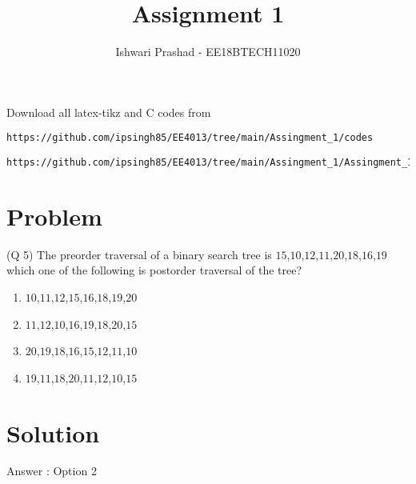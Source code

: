 \documentclass[journal,12pt,twocolumn]{IEEEtran}
\begin{document}
     \def\rightbox#1{\makebox[0in][r]{#1}}
     \def\centbox#1{\makebox[0in]{#1}}
     \def\topbox#1{\raisebox{-\baselineskip}[0in][0in]{#1}}
     \def\midbox#1{\raisebox{-0.5\baselineskip}[0in][0in]{#1}}
\vspace{3cm}
\title{Assignment 1}
\author{Ishwari Prashad - EE18BTECH11020}
\maketitle
\newpage
\bigskip
\renewcommand{\thefigure}{\theenumi}
\renewcommand{\thetable}{\theenumi}
Download all latex-tikz and C codes from 
%
\begin{lstlisting}
https://github.com/ipsingh85/EE4013/tree/main/Assingment_1/codes
\end{lstlisting}
\begin{lstlisting}
https://github.com/ipsingh85/EE4013/tree/main/Assingment_1/Assingment_1.tex
\end{lstlisting}
\section{Problem}
(Q 5) The preorder traversal of a binary search tree is $15$,$10$,$12$,$11$,$20$,$18$,$16$,$19$ which one of the following is postorder traversal of the tree?

\begin{enumerate}
    \item $10$,$11$,$12$,$15$,$16$,$18$,$19$,$20$
    \item $11$,$12$,$10$,$16$,$19$,$18$,$20$,$15$
    \item $20$,$19$,$18$,$16$,$15$,$12$,$11$,$10$
    \item $19$,$11$,$18$,$20$,$11$,$12$,$10$,$15$
\end{enumerate}
\section{Solution}
Answer : Option 2
\end{document}
